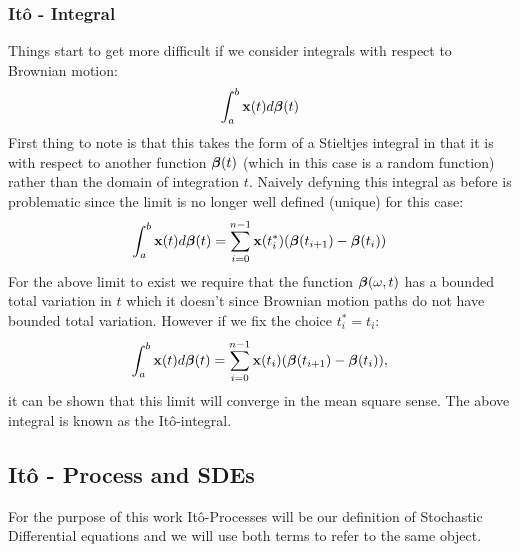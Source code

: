 \documentclass[a4paper,12pt,twoside,openright]{report}
\theoremstyle{definition}
\begin{document}
\subsubsection{Itô  - Integral}
Things start to get more difficult if we consider integrals with respect to Brownian motion:
\begin{align}\label{eq:brownian_integral}
    \int_{a}^b {\mathbf{x}}(t) d{\bm{\beta}}(t)
\end{align}
First thing to note is that this takes the form of a Stieltjes integral in that it is with respect to another function ${\bm{\beta}}(t)$ (which in this case is a random function) rather than the domain of integration $t$. Naively defyning this integral as before is problematic since the limit is no longer well defined (unique) for this case:
\begin{align}\label{eq:brownian_integral_bad}
    \int_{a}^b {\mathbf{x}}(t) d{\bm{\beta}}(t) = \sum_{i=0}^{n-1} {\mathbf{x}}(t^{*}_i)({\bm{\beta}}(t_{i+1}) - {\bm{\beta}}(t_i))
\end{align}
For the above limit to exist we require that the function ${\bm{\beta}}(\omega, t)$ has a bounded total variation in $t$ which it doesn't since Brownian motion paths do not have bounded total variation. However if we fix the choice $t_i^{*} = t_i$:
\begin{align}\label{eq:ito_integral}
    \int_{a}^b {\mathbf{x}}(t) d{\bm{\beta}}(t) = \sum_{i=0}^{n-1} {\mathbf{x}}(t_i)({\bm{\beta}}(t_{i+1}) - {\bm{\beta}}(t_i)),
\end{align}
it can be shown that this limit will converge in the mean square sense. The above integral is known as the Itô-integral.
\subsection{Itô  - Process and SDEs}

For the purpose of this work Itô-Processes will be our definition of Stochastic Differential equations and we will use both terms to refer to the same object.
\end{document}
